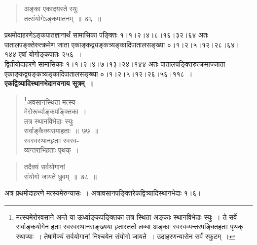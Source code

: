 \documentclass[11pt, openany]{book}
\begin{document}
\newpage

\begin{quote}
{\gk अङ्का एकादयस्ते स्युः\\
तत्संयोगेऽङ्कपातनम्~॥~७६~॥}
\end{quote}

प्रथमोदाहरणेऽङ्कपातज्ञानार्थं \;सामासिका \;पङ्क्तिः \;१।१।२।४।८।१६।३२।६४ \;अतः पातालपङ्क्तेरुत्क्रमेण \;जाता \;एकाङ्कद्व्यङ्कत्र्यङ्कादिपातालसङ्ख्या \;०।१।२।५।१२।२८।६४। १४४ एषां योगोङ्कपातः २५६~। \\

द्वितीयोदाहरणे सामासिकाः १।१।२।४।७।१३।२४।१४४ अतः पातालपङ्क्तिरुत्क्रमाज्जाता एकाङ्कद्व्यङ्कत्र्यङ्कादिपातालसङ्ख्या ०।१।२।५।१२।२६।५६।११८~।\\

\textbf{एकद्वित्र्यादिस्थानभेदानयनाय सूत्रम्~।}

\begin{quote}
\renewcommand{\thefootnote}{१}\footnote{मत्स्यमेरोरवसाने अन्ते या ऊर्ध्वाङ्कपङ्क्तिका तत्र स्थिता अङ्काः स्थानविभेदाः स्युः~। ते सर्वे सर्वाङ्कयोगेन हताः स्वस्वस्थानसङ्ख्यया हृतास्ततो लब्धा अङ्काः स्वस्वव्यन्तरपङ्क्तिहताः पृथक् स्थाप्याः~। तेषामैक्यं सर्वयोगानां निश्चयेन संयोगो जायते~। उदाहरणन्यासेन सर्वं स्फुटम्~।}{\gk अवसानस्थिता मत्स्य-\\
मेरोरूर्ध्वाङ्कपङ्क्तिका~।\\
तत्र स्थानविभेदाः स्युः\\
सर्वाङ्कैक्यसमाहताः~॥~७७~॥\\
स्वस्वस्थानहृताः स्वस्व-\\
व्यन्तराभिहताः पृथक्~।}
\end{quote}

\newpage

\begin{quote}
{\gk तदैक्यं सर्वयोगानां\\
संयोगो जायते ध्रुवम्~॥~७८~॥}
\end{quote}

अत्र प्रथमोदाहरणे मत्स्यमेरुन्यासः~। अत्रावसानपङ्क्तिरेकद्वित्र्यादिस्थानभेदाः १।६।
\end{document}
